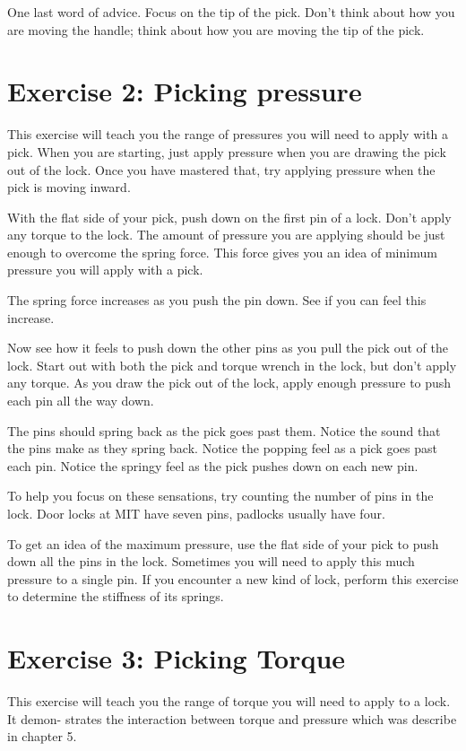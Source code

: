 One last word of advice. Focus on the tip of the pick. Don't think about how you are 
moving the handle; think about how you are moving the tip of the pick.

\section{Exercise 2: Picking pressure}
This exercise will teach you the range of pressures you will need to apply with a pick. When 
you are starting, just apply pressure when you are drawing the pick out of the lock. Once 
you have mastered that, try applying pressure when the pick is moving inward. 

With the flat side of your pick, push down on the first pin of a lock. Don't apply any 
torque to the lock. The amount of pressure you are applying should be just enough to 
overcome the spring force. This force gives you an idea of minimum pressure you will apply 
with a pick. 

The spring force increases as you push the pin down. See if you can feel this increase. 

Now see how it feels to push down the other pins as you pull the pick out of the lock. 
Start out with both the pick and torque wrench in the lock, but don't apply any torque. As 
you draw the pick out of the lock, apply enough pressure to push each pin all the way down. 

The pins should spring back as the pick goes past them. Notice the sound that the pins 
make as they spring back. Notice the popping feel as a pick goes past each pin. Notice the 
springy feel as the pick pushes down on each new pin. 

To help you focus on these sensations, try counting the number of pins in the lock. Door 
locks at MIT have seven pins, padlocks usually have four. 

To get an idea of the maximum pressure, use the flat side of your pick to push down all 
the pins in the lock. Sometimes you will need to apply this much pressure to a single pin. 
If you encounter a new kind of lock, perform this exercise to determine the stiffness of its 
springs. 

\section{Exercise 3: Picking Torque}
This exercise will teach you the range of torque you will need to apply to a lock. It demon- 
strates the interaction between torque and pressure which was describe in chapter 5. 

